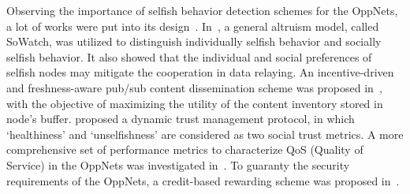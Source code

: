 Observing the importance of selfish behavior detection
schemes for the OppNets,
a lot of works were
put into its design~\cite{DBLP:journals/fgcs/JedariXCDTA19, Zhou2015Incentive, Chen2014Dynamic, DBLP:journals/tdsc/ChoC18, Wang2016A}.
In~\cite{DBLP:journals/fgcs/JedariXCDTA19},
a general altruism model,
called SoWatch,
was utilized to
distinguish individually selfish behavior 
and socially selfish behavior.
It also showed that the individual 
and social preferences of selfish nodes
may mitigate the cooperation in data relaying.
An incentive-driven and freshness-aware 
pub/sub content dissemination scheme
was proposed in~\cite{Zhou2015Incentive},
with the objective of 
maximizing the utility of the content inventory 
stored in node's buffer.
\cite{Chen2014Dynamic} proposed a dynamic trust management protocol,
in which `healthiness' and
`unselfishness' are considered as two social trust metrics.
A more comprehensive set of performance metrics to characterize QoS (Quality of Service)
in the OppNets
was investigated in~\cite{DBLP:journals/tdsc/ChoC18}.
To guaranty the security requirements of the OppNets,
a credit-based
rewarding scheme was proposed in~\cite{Wang2016A}.

